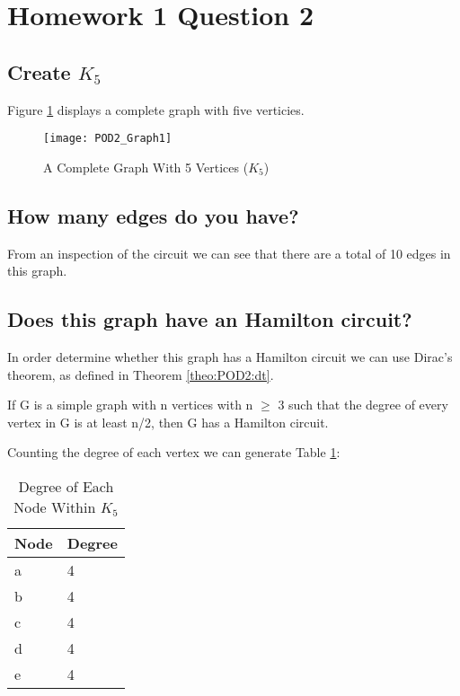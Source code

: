 \documentclass{article}
\newcommand{\YearPath}{../../../LatexConfig} %
\newcommand{\SemesterPath}{../../LatexConfig} %
\newcommand{\ClassPath}{../LatexConfig} %
\begin{document}




\section{Homework 1 Question 2}
\subsection{Create $K_5$}
Figure \ref{fig:K5_0} displays a complete graph with five verticies.
\begin{figure}[ht]
\centering
\texttt{[image: POD2\_Graph1]}
\caption{A Complete Graph With 5 Vertices ($K_5$)}
\label{fig:K5_0}
\end{figure}

\subsection{How many edges do you have?}
From an inspection of the circuit we can see that there are a total of 10 edges in this graph.

\newpage
\subsection{Does this graph have an Hamilton circuit?}
In order determine whether this graph has a Hamilton circuit we can use Dirac's theorem, as defined in Theorem \ref{theo:POD2:dt}.

\begin{theo}
If G is a simple graph with n vertices with n $\geq$ 3 such that the
degree of every vertex in G is at least n/2, then G has a Hamilton circuit.
\label{theo:POD2:dt}
\end{theo}

Counting the degree of each vertex we can generate Table \ref{tab:POD2deg}:

\begin{table}[ht]
\begin{center}
\begin{tabular}{l|l}
Node & Degree \\
\hline
a & 4 \\
b & 4 \\
c & 4 \\
d & 4 \\
e & 4 \\
\end{tabular}
\end{center}
\caption{Degree of Each Node Within $K_5$}
\label{tab:POD2deg}
\end{table}
\end{document}
